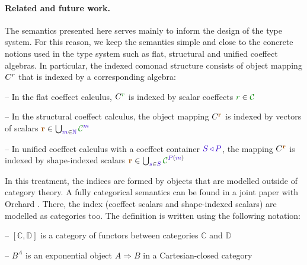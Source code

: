\paragraph{Related and future work.}
The semantics presented here serves main\-ly to inform the design of the type system. For this
reason, we keep the semantics simple and close to the concrete notions used in the type system
such as flat, structural and unified coeffect algebras. In particular, the indexed comonad
structure consists of object mapping $C^{r}$ that is indexed by a corresponding algebra:

\begin{compactitem}
\item[--] In the flat coeffect calculus, $\ctyp{\cclrd{r}}{}$ is indexed by scalar coeffects $\cclrd{r} \in \C$
\item[--] In the structural coeffect calculus, the object mapping $\ctyp{\aclrd{\textbf{r}}}{}$ is
  indexed by vectors of scalars $\aclrd{\textbf{r}} \in \bigcup_{\sclrd{m}\in \sclrd{\mathbb{N}}} \C^{\sclrd{m}}$
\item[--] In unified coeffect calculus with a coeffect container $\SH\,\sclrd{\triangleleft}\,\SP$,
  the mapping $\ctyp{\aclrd{\textbf{r}}}{}$ is indexed by shape-indexed scalars
  $\aclrd{\textbf{r}} \in \bigcup_{\sclrd{s}\in \SH} \C^{\SP(\sclrd{m})}$
\end{compactitem}

\noindent
In this treatment, the indices are formed by objects that are modelled outside of category theory.
A fully categorical semantics can be found in a joint paper with Orchard \cite{coeffects-icfp14}.
There, the index (coeffect scalars and shape-indexed scalars) are modelled as categories too.
The definition is written using the following notation:

\begin{compactitem}
\item[--] $[\mathbb{C}, \mathbb{D}]$ is a category of functors between categories $\mathbb{C}$ and $\mathbb{D}$
\item[--] $B^A$ is an exponential object $A \Rightarrow B$ in a Cartesian-closed category
\end{compactitem}

